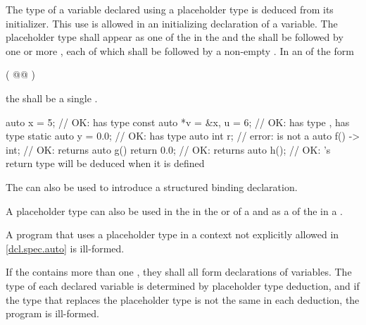 \pnum
The type of a variable declared using a placeholder type is
deduced from its initializer.
This use is allowed
in an initializing declaration of a variable.
The placeholder type shall appear as one of the
 in the
 and the
shall be followed by one or more
,
each of which shall
be followed by a non-empty
.
In an  of the form
\begin{codeblock}
( @\textrm{}@ )
\end{codeblock}
the  shall be a single
.
\begin{example}
\begin{codeblock}
auto x = 5;                     // OK:  has type 
const auto *v = &x, u = 6;      // OK:  has type ,  has type 
static auto y = 0.0;            // OK:  has type 
auto int r;                     // error:  is not a 
auto f() -> int;                // OK:  returns 
auto g() { return 0.0; }        // OK:  returns 
auto h();                       // OK: 's return type will be deduced when it is defined
\end{codeblock}
\end{example}
The  
can also be used to introduce
a structured binding declaration.

\pnum
A placeholder type can also be used
in the  in
the  or  of a
and as a 
of the 
in a .

\pnum
A program that uses a placeholder type in a context not
explicitly allowed in \ref{dcl.spec.auto} is ill-formed.

\pnum
If the  contains more than one
, they shall all form declarations of
variables. The type of each declared variable is determined
by placeholder type deduction,
and if the type that replaces the placeholder type is not the
same in each deduction, the program is ill-formed.

